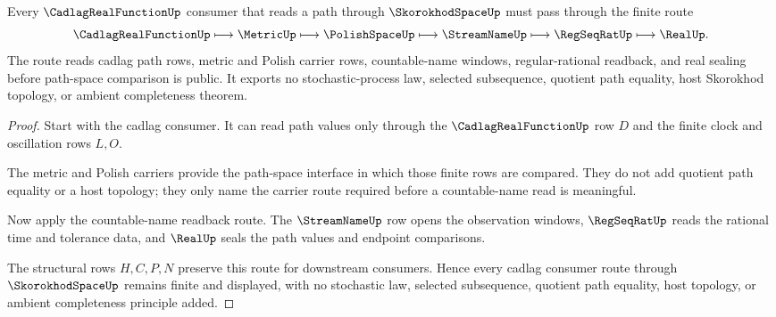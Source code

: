 \begin{theorem}
\label{thm:skorokhod-space-cadlag-consumer-route}
Every $\CadlagRealFunctionUp$ consumer that reads a path through $\SkorokhodSpaceUp$ must pass through the finite route
$$
\CadlagRealFunctionUp \longmapsto \MetricUp \longmapsto \PolishSpaceUp \longmapsto \StreamNameUp \longmapsto \RegSeqRatUp \longmapsto \RealUp .
$$
The route reads cadlag path rows, metric and Polish carrier rows, countable-name windows, regular-rational readback, and real sealing before path-space comparison is public. It exports no stochastic-process law, selected subsequence, quotient path equality, host Skorokhod topology, or ambient completeness theorem.
\end{theorem}
\begin{proof}
Start with the cadlag consumer. It can read path values only through the $\CadlagRealFunctionUp$ row $D$ and the finite clock and oscillation rows $L,O$.

The metric and Polish carriers provide the path-space interface in which those finite rows are compared. They do not add quotient path equality or a host topology; they only name the carrier route required before a countable-name read is meaningful.

Now apply the countable-name readback route. The $\StreamNameUp$ row opens the observation windows, $\RegSeqRatUp$ reads the rational time and tolerance data, and $\RealUp$ seals the path values and endpoint comparisons.

The structural rows $H,C,P,N$ preserve this route for downstream consumers. Hence every cadlag consumer route through $\SkorokhodSpaceUp$ remains finite and displayed, with no stochastic law, selected subsequence, quotient path equality, host topology, or ambient completeness principle added.
\end{proof}




